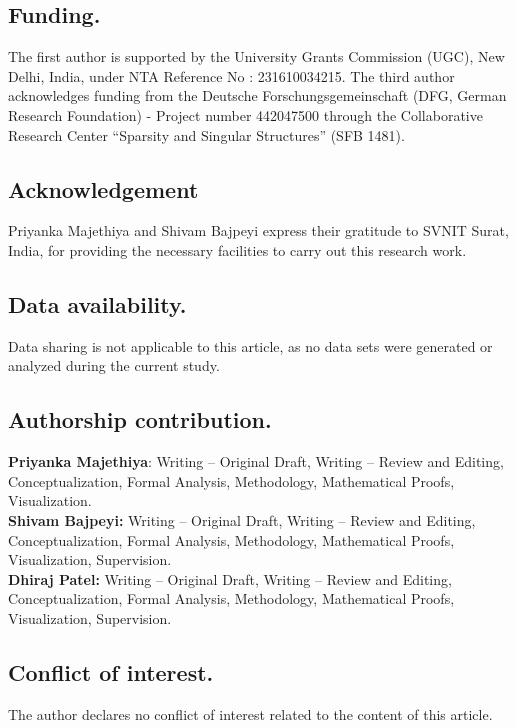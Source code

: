 \documentclass[11pt, a4paper]{article}
\theoremstyle{definition}
\numberwithin{equation}{section}
\begin{document}
\subsection{Funding.} 
 \noindent The first author is supported by the University Grants Commission (UGC), New Delhi, India, under NTA Reference No : 231610034215. The third author acknowledges funding from the Deutsche Forschungsgemeinschaft (DFG, German Research Foundation) - Project number 442047500 through the Collaborative Research Center ``Sparsity and Singular Structures” (SFB 1481).

\subsection{Acknowledgement}
\noindent 
Priyanka Majethiya and Shivam Bajpeyi express their gratitude to SVNIT Surat, India, for providing the necessary facilities to carry out this research work.


\subsection{Data availability.} 
\noindent 
Data sharing is not applicable to this article, as no data sets were generated
or analyzed during the current study.

\subsection{Authorship contribution.}
\noindent
\textbf{Priyanka Majethiya}: Writing – Original Draft, Writing – Review and Editing, Conceptualization, Formal Analysis, Methodology, Mathematical Proofs, Visualization. \\
\textbf{Shivam Bajpeyi:} Writing – Original Draft, Writing – Review and Editing, Conceptualization, Formal Analysis, Methodology, Mathematical Proofs, Visualization, Supervision.\\
\textbf{Dhiraj Patel:} Writing – Original Draft, Writing – Review and Editing, Conceptualization, Formal Analysis, Methodology, Mathematical Proofs, Visualization, Supervision.

\subsection{Conflict of interest.} 
\noindent 
The author declares no conflict of interest related to the content of this article.

 
 
\end{document}
